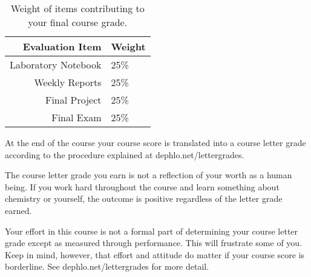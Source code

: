 \documentclass[letterpaper,oneside,onecolumn,11pt,article]{memoir}
\begin{document}
\begin{table}[h]
\caption{\sffamily Weight of items contributing to your final course grade.}
\label{tab:weights}
\begin{tabular}{r|l} \toprule
\textbf{Evaluation Item} & \textbf{Weight} \\ \hline
Laboratory Notebook & 25\% \\
Weekly Reports & 25\% \\
Final Project & 25\% \\
Final Exam & 25\% \\
\bottomrule
\end{tabular}
\end{table}

At the end of the course your course score is translated into a course letter grade according to the procedure explained at dephlo.net/lettergrades. 

The course letter grade you earn is not a reflection of your worth as a human being. If you work hard throughout the course and learn something about chemistry or yourself, the outcome is positive regardless of the letter grade earned. 

Your effort in this course is not a formal part of determining your course letter grade except as measured through performance. This will frustrate some of you. Keep in mind, however, that effort and attitude do matter if your course score is borderline. See dephlo.net/lettergrades for more detail. 
\end{document}
